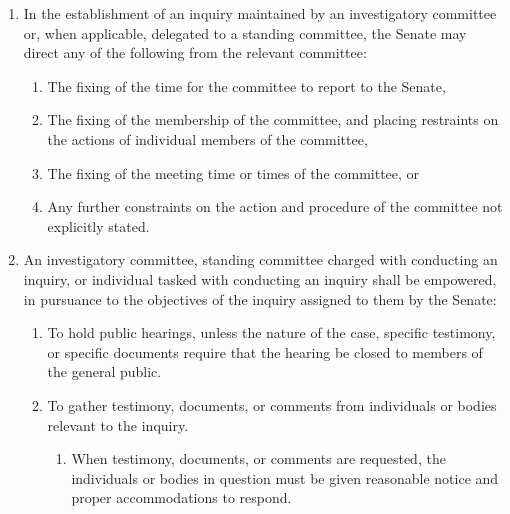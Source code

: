 \documentclass{uniondoc}
\begin{document}
\begin{enumerate}
\begin{enumerate}
\begin{enumerate}
			            \item If the Senate believes the chair of an investigatory committee has failed to meet the duties of office outlined in Article VIII of these Bylaws, then they may remove the chair by simple majority vote.
			            \item If an investigatory committee does not have a chair, the Grand Marshal may appoint one without need for confirmation by the Senate as a whole, unless an appointment by the Grand Marshal is formally objected to by two or more Senators, in which case the appointment shall follow the standard nomination process.
		            \end{enumerate}
	      \end{enumerate}
	\item In the establishment of an inquiry maintained by an investigatory committee or, when applicable, delegated to a standing committee, the Senate may direct any of the following from the relevant committee:
	      \begin{enumerate}
		      \item The fixing of the time for the committee to report to the Senate,
		      \item The fixing of the membership of the committee, and placing restraints on the actions of individual members of the committee,
		      \item The fixing of the meeting time or times of the committee, or
		      \item Any further constraints on the action and procedure of the committee not explicitly stated.
	      \end{enumerate}
	\item An investigatory committee, standing committee charged with conducting an inquiry, or individual tasked with conducting an inquiry shall be empowered, in pursuance to the objectives of the inquiry assigned to them by the Senate:
	      \begin{enumerate}
		      \item To hold public hearings, unless the nature of the case, specific testimony, or specific documents require that the hearing be closed to members of the general public.
		      \item To gather testimony, documents, or comments from individuals or bodies relevant to the inquiry.
		            \begin{enumerate}
			            \item When testimony, documents, or comments are requested, the individuals or bodies in question must be given reasonable notice and proper accommodations to respond.

\end{enumerate}
\end{enumerate}
\end{enumerate}
\end{document}
